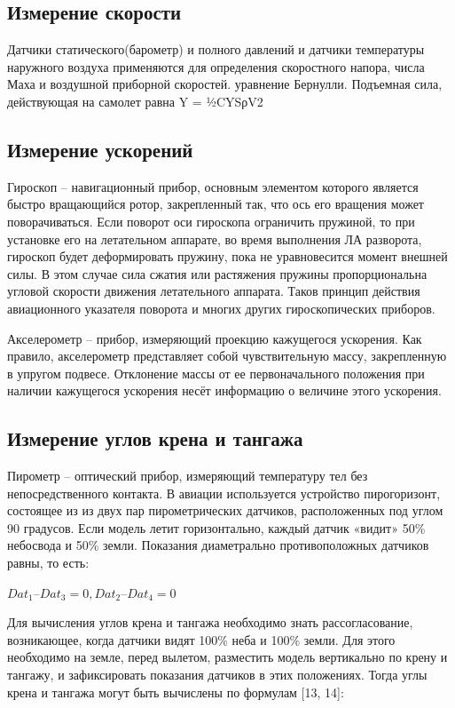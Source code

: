 \documentclass[nir, och, master]{SCWorks}
\begin{document}
\subsection*{Измерение скорости}
Датчики статического(барометр) и полного давлений и датчики температуры наружного воздуха применяются для определения скоростного напора, числа Маха и воздушной приборной скоростей. 
уравнение Бернулли.
Подъемная сила, действующая на самолет равна Y = ½CYSρV2


\subsection*{Измерение ускорений}
Гироскоп – навигационный прибор, основным элементом которого является быстро 
вращающийся ротор, закрепленный так, что ось его вращения может поворачиваться. 
Если поворот оси гироскопа ограничить пружиной, то при установке его на 
летательном аппарате, во время выполнения ЛА разворота, гироскоп будет 
деформировать пружину, пока не уравновесится момент внешней силы. 
В этом случае сила сжатия или растяжения пружины пропорциональна угловой скорости 
движения летательного аппарата. Таков принцип действия авиационного 
указателя поворота и многих других гироскопических приборов.

Акселерометр – прибор, измеряющий проекцию кажущегося ускорения. 
Как правило, акселерометр представляет собой чувствительную массу, 
закрепленную в упругом подвесе. Отклонение массы от ее первоначального 
положения при наличии кажущегося ускорения несёт информацию о величине этого ускорения. 

\subsection*{Измерение углов крена и тангажа}
Пирометр – оптический прибор, измеряющий температуру тел без непосредственного 
контакта. В авиации используется устройство пирогоризонт, состоящее из из двух 
пар пирометрических датчиков, расположенных под углом 90 градусов. 
Если модель летит горизонтально, каждый датчик «видит» 50\%
небосвода и 50\% земли. Показания диаметрально противоположных датчиков равны, то есть: 

$Dat_1 – Dat_3 = 0,

Dat_2 – Dat_4 = 0$

Для вычисления углов крена и тангажа необходимо знать рассогласование, 
возникающее, когда датчики видят 100\% неба и 100\% земли. Для этого необходимо 
на земле, перед вылетом, разместить модель вертикально по крену и тангажу, и 
зафиксировать показания  датчиков в этих положениях. Тогда углы крена и тангажа 
могут быть вычислены по формулам [13, 14]: 
\end{document}
